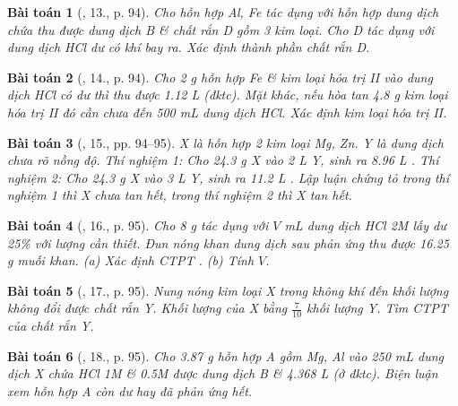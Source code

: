 \documentclass{article}
\newtheorem{baitoan}{Bài toán}
\begin{document}
\begin{baitoan}[\cite{An_Hoa_Hoc_nang_cao_8_9}, 13., p. 94]
	Cho hỗn hợp {\rm Al, Fe} tác dụng với hỗn hợp dung dịch chứa {\rm{}} thu được dung dịch B \& chất rắn D gồm 3 kim loại. Cho D tác dụng với dung dịch {\rm HCl} dư có khí bay ra. Xác định thành phần chất rắn D.
\end{baitoan}

\begin{baitoan}[\cite{An_Hoa_Hoc_nang_cao_8_9}, 14., p. 94]
	Cho {\rm2 g} hỗn hợp {\rm Fe} \& kim loại hóa trị II vào dung dịch {\rm HCl} có dư thì thu được {\rm1.12 L } (đktc). Mặt khác, nếu hòa tan {\rm4.8 g} kim loại hóa trị II đó cần chưa đến {\rm500 mL} dung dịch {\rm HCl}. Xác định kim loại hóa trị II.
\end{baitoan}

\begin{baitoan}[\cite{An_Hoa_Hoc_nang_cao_8_9}, 15., pp. 94--95]
	X là hỗn hợp 2 kim loại {\rm Mg, Zn}. Y là dung dịch {\rm{}} chưa rõ nồng độ. Thí nghiệm 1: Cho {\rm24.3 g} X vào {\rm2 L} Y, sinh ra {\rm8.96 L }. Thí nghiệm 2: Cho {\rm24.3 g} X vào {\rm3 L} Y, sinh ra {\rm11.2 L }. Lập luận chứng tỏ trong thí nghiệm 1 thì X chưa tan hết, trong thí nghiệm 2 thì X tan hết.
\end{baitoan}

\begin{baitoan}[\cite{An_Hoa_Hoc_nang_cao_8_9}, 16., p. 95]
	Cho {\rm8 g } tác dụng với $V$ {\rm mL} dung dịch {\rm HCl 2M} lấy dư {\rm25\%} với lượng cần thiết. Đun nóng khan dung dịch sau phản ứng thu được {\rm16.25 g} muối khan. (a) Xác định {\rm CTPT} {\rm{}}. (b) Tính $V$.
\end{baitoan}

\begin{baitoan}[\cite{An_Hoa_Hoc_nang_cao_8_9}, 17., p. 95]
	Nung nóng kim loại X trong không khí đến khối lượng không đổi được chất rắn Y. Khối lượng của X bằng $\frac{7}{10}$ khối lượng Y. Tìm {\rm CTPT} của chất rắn Y.
\end{baitoan}

\begin{baitoan}[\cite{An_Hoa_Hoc_nang_cao_8_9}, 18., p. 95]
	Cho {\rm3.87 g} hỗn hợp A gồm {\rm Mg, Al} vào {\rm250 mL} dung dịch X chứa {\rm HCl 1M} \& {\rm{} 0.5M} được dung dịch B \& {\rm4.368 L } (ở đktc). Biện luận xem hỗn hợp A còn dư hay đã phản ứng hết.
\end{baitoan}
\end{document}
